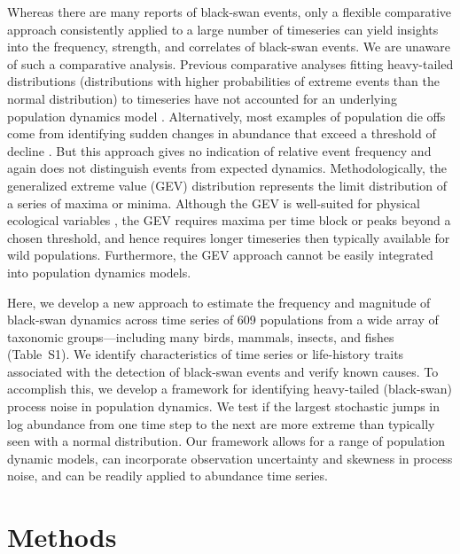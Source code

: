 Whereas there are many reports of black-swan events,
only a flexible comparative approach consistently applied 
to a large number of timeseries can yield insights into the frequency, strength,
and correlates of black-swan events. 
We are unaware of such a comparative analysis.
Previous comparative analyses fitting
heavy-tailed distributions
(distributions with higher probabilities of extreme events
than the normal distribution)
to timeseries
have not accounted for an underlying population dynamics model
\citep{keitt1998, allen2001, halley2002, segura2013}.
Alternatively, most examples of population die offs come from identifying
sudden changes in abundance that exceed a threshold of decline
\citep[e.g.][]{young1994, gerber2001, reed2003, fey2015}.
But this approach gives no indication of relative event frequency
and again does not distinguish events from
expected dynamics.
Methodologically, the generalized extreme value (GEV) distribution represents
the limit distribution of a series of maxima or minima.
Although the GEV is well-suited for physical ecological variables
\citep[e.g.\ sedimentation rates or wind speeds;][]{gaines1993, denny2009},
the GEV requires maxima per time block
or peaks beyond a chosen threshold,
and hence requires longer timeseries then typically available
for wild populations.
Furthermore, the GEV approach cannot be easily integrated into population dynamics models.

Here, we develop a new approach to estimate the frequency and magnitude of
black-swan dynamics across time series of 609 populations from a wide array of
taxonomic groups---including many  birds, mammals, insects, and fishes
(Table~S1). We identify characteristics of time series or
life-history traits associated with the detection of black-swan events and
verify known causes. To accomplish this, we develop a framework for identifying
heavy-tailed (black-swan) process noise in population dynamics.
We test if the largest stochastic jumps in log abundance from one time step to the next
are more extreme than typically seen with a normal distribution. Our framework
allows for a range of population dynamic models, can incorporate observation
uncertainty and skewness in process noise, and can be readily applied to
abundance time series.

\section{Methods}

